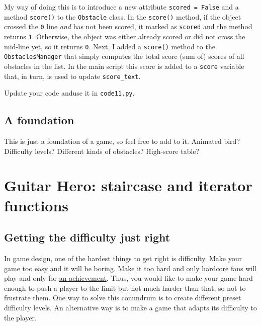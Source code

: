 \documentclass[
]{book}
\begin{document}
My way of doing this is to introduce a new attribute \texttt{scored\ =\ False} and a method \texttt{score()} to the \texttt{Obstacle} class. In the \texttt{score()} method, if the object crossed the \texttt{0} line \emph{and} has not been scored, it marked as \texttt{scored} and the method returns \texttt{1}. Otherwise, the object was either already scored or did not cross the mid-line yet, so it returns \texttt{0}. Next, I added a \texttt{score()} method to the \texttt{ObstaclesManager} that simply computes the total score (sum of) scores of all obstacles in the list. In the main script this score is added to a \texttt{score} variable that, in turn, is used to update \texttt{score\_text}.

Update your code anduse it in \texttt{code11.py}.

\hypertarget{a-foundation}{%
\section{A foundation}\label{a-foundation}}

This is just a foundation of a game, so feel free to add to it. Animated bird? Difficulty levels? Different kinds of obstacles? High-score table?

\hypertarget{seminar-02-06}{%
\chapter{Guitar Hero: staircase and iterator functions}\label{seminar-02-06}}

\hypertarget{getting-the-difficulty-just-right}{%
\section{Getting the difficulty just right}\label{getting-the-difficulty-just-right}}

In game design, one of the hardest things to get right is difficulty. Make your game too easy and it will be boring. Make it too hard and only hardcore fans will play and only for \href{https://www.imdb.com/title/tt4975856/}{an achievement}. Thus, you would like to make your game hard enough to push a player to the limit but not much harder than that, so not to frustrate them. One way to solve this conundrum is to create different preset difficulty levels. An alternative way is to make a game that adapts its difficulty to the player.
\end{document}

